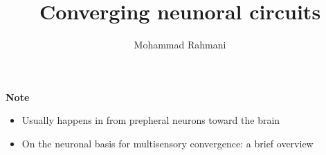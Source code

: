 \documentclass[a4paper]{article}
\title{Converging neunoral circuits}
\date{}
\author{Mohammad Rahmani}
\begin{document}
    \maketitle
    \textbf{Note}
    \begin{itemize}
        \item Usually happens in from prepheral neurons toward the brain
    \end{itemize}
    
    \begin{itemize}
        \item On the neuronal basis for multisensory convergence: a brief overview 
    \end{itemize}
    
    
\end{document}
